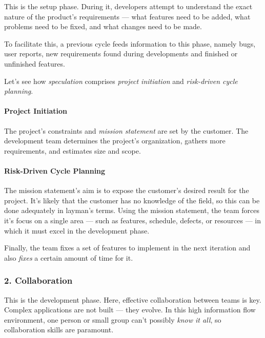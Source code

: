 \documentclass[main.tex]{subfiles}
\begin{document}
This is the setup phase. During it, developers attempt to understand the exact nature of the product's requirements --- what features need to be added, what problems need to be fixed, and what changes need to be made.

To facilitate this, a previous cycle feeds information to this phase, namely bugs, user reports, new requirements found during developments and finished or unfinished features.

Let's see how \emph{speculation} comprises \emph{project initiation} and \emph{risk-driven cycle planning}.

\paragraph{Project Initiation} The project's constraints and \textit{mission statement} are set by the customer. The development team determines the project's organization, gathers more requirements, and estimates size and scope.


\paragraph{Risk-Driven Cycle Planning} The mission statement's aim is to expose the customer's desired result for the project.
It's likely that the customer has no knowledge of the field, so this can be done adequately in layman's terms. Using the mission statement, the team forces it's focus on a single area --- such as features, schedule, defects, or resources --- in which it must excel in the development phase.

Finally, the team fixes a set of features to implement in the next iteration and also \emph{fixes} a certain amount of time for it.

\subsubsection[Collaboration]{2. Collaboration}

This is the development phase. Here, effective collaboration between teams is key. Complex applications are not built --- they evolve. In this high information flow environment, one person or small group can't possibly \textsl{know it all}, so collaboration skills are paramount.
\end{document}
